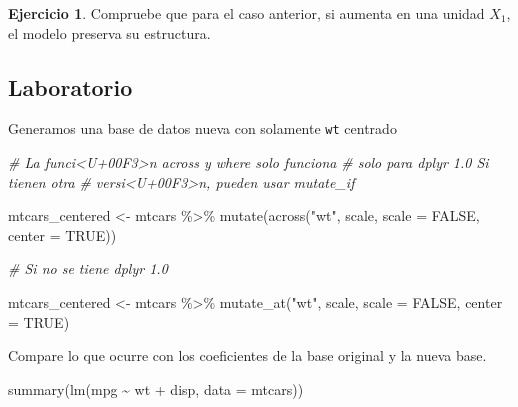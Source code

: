 \documentclass[
  12pt,
]{book}
\newenvironment{Shaded}{\begin{snugshade}}{\end{snugshade}}
\newcommand{\AttributeTok}[1]{\textcolor[rgb]{0.77,0.63,0.00}{#1}}
\newcommand{\CommentTok}[1]{\textcolor[rgb]{0.56,0.35,0.01}{\textit{#1}}}
\newcommand{\ConstantTok}[1]{\textcolor[rgb]{0.00,0.00,0.00}{#1}}
\newcommand{\FunctionTok}[1]{\textcolor[rgb]{0.00,0.00,0.00}{#1}}
\newcommand{\NormalTok}[1]{#1}
\newcommand{\OtherTok}[1]{\textcolor[rgb]{0.56,0.35,0.01}{#1}}
\newcommand{\SpecialCharTok}[1]{\textcolor[rgb]{0.00,0.00,0.00}{#1}}
\newcommand{\StringTok}[1]{\textcolor[rgb]{0.31,0.60,0.02}{#1}}
\theoremstyle{definition}
\theoremstyle{definition}
\theoremstyle{definition}
\newtheorem{exercise}{Ejercicio}[chapter]
\theoremstyle{definition}
\theoremstyle{remark}
\begin{document}
\begin{exercise}
\protect\hypertarget{exr:unnamed-chunk-132}{}\label{exr:unnamed-chunk-132}Compruebe que para el caso anterior, si aumenta en una unidad \(X_{1}\), el modelo preserva su estructura.
\end{exercise}

\hypertarget{laboratorio-5}{%
\subsection{Laboratorio}\label{laboratorio-5}}

Generamos una base de datos nueva con solamente \texttt{wt} centrado

\begin{Shaded}
\begin{Highlighting}[]
\CommentTok{\# La funci\textless{}U+00F3\textgreater{}n across y where solo funciona}
\CommentTok{\# solo para dplyr 1.0 Si tienen otra}
\CommentTok{\# versi\textless{}U+00F3\textgreater{}n, pueden usar mutate\_if}

\NormalTok{mtcars\_centered }\OtherTok{\textless{}{-}}\NormalTok{ mtcars }\SpecialCharTok{\%\textgreater{}\%}
    \FunctionTok{mutate}\NormalTok{(}\FunctionTok{across}\NormalTok{(}\StringTok{"wt"}\NormalTok{, scale, }\AttributeTok{scale =} \ConstantTok{FALSE}\NormalTok{, }\AttributeTok{center =} \ConstantTok{TRUE}\NormalTok{))}

\CommentTok{\# Si no se tiene dplyr 1.0}

\NormalTok{mtcars\_centered }\OtherTok{\textless{}{-}}\NormalTok{ mtcars }\SpecialCharTok{\%\textgreater{}\%}
    \FunctionTok{mutate\_at}\NormalTok{(}\StringTok{"wt"}\NormalTok{, scale, }\AttributeTok{scale =} \ConstantTok{FALSE}\NormalTok{, }\AttributeTok{center =} \ConstantTok{TRUE}\NormalTok{)}
\end{Highlighting}
\end{Shaded}

Compare lo que ocurre con los coeficientes de la base original y la nueva base.

\begin{Shaded}
\begin{Highlighting}[]
\FunctionTok{summary}\NormalTok{(}\FunctionTok{lm}\NormalTok{(mpg }\SpecialCharTok{\textasciitilde{}}\NormalTok{ wt }\SpecialCharTok{+}\NormalTok{ disp, }\AttributeTok{data =}\NormalTok{ mtcars))}
\end{Highlighting}
\end{Shaded}
\end{document}
